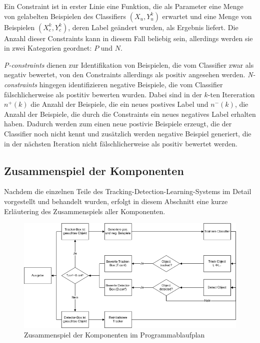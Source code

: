 	Ein Constraint ist in erster Linie eine Funktion, die als Parameter eine Menge von gelabelten Beispielen des Classifiers $(X_{u},Y_{u}^{k})$ erwartet und eine Menge von Beispielen $(X_{c}^{k},Y_{c}^{k})$, deren Label geändert wurden, als Ergebnis liefert. Die Anzahl dieser Constraints kann in diesem Fall beliebig sein, allerdings werden sie in zwei Kategorien geordnet: $P$ und $N$.

	\textit{P-constraints} dienen zur Identifikation von Beispielen, die vom Classifier zwar als negativ bewertet, von den Constraints allerdings als positiv angesehen werden. \textit{N-constraints} hingegen identifizieren negative Beispiele, die vom Classifier fälschlicherweise als postitiv bewerten wurden. Dabei sind in der $k$-ten Itereration $n^{+}(k)$ die Anzahl der Beispiele, die ein neues postives Label und $n^{-}(k)$, die Anzahl der Beispiele, die durch die Constraints ein neues negatives Label erhalten haben. Dadurch werden zum einen neue postivie Beispiele erzeugt, die der Classifier noch nicht kennt und zusätzlich werden negative Beispiel generiert, die in der nächsten Iteration nicht fälschlicherweise als positiv bewertet werden.

	\subsection{Zusammenspiel der Komponenten}
	Nachdem die einzelnen Teile des Tracking-Detection-Learning-Systems im Detail vorgestellt und behandelt wurden, erfolgt in diesem Abschnitt eine kurze Erläutering des Zusammenspiels aller Komponenten.

	\begin{figure}
	\includegraphics[scale=0.5]{../pictures/PAP.png}
	\caption{Zusammenspiel der Komponenten im Programmablaufplan}
	\label{abb:pap}
	\end{figure}

